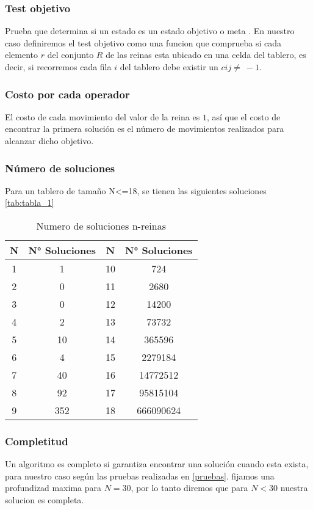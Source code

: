 \documentclass[conference]{IEEEtran}
\begin{document}
\subsubsection{Test objetivo}\label{AA_6}
Prueba que determina si un estado es un estado objetivo o meta \cite{r2}. En nuestro caso definiremos el test objetivo como una funcion que comprueba si cada elemento $r$ del conjunto $R$ de las reinas esta ubicado  en una celda del tablero, es decir, si recorremos cada fila $i$ del tablero debe existir un $c{ij} \neq\ -1$.

\subsubsection{Costo por cada operador}\label{AA_7}
El costo de cada movimiento del valor de la reina es $1$, así que el costo de encontrar la primera solución es el número de movimientos realizados para alcanzar dicho objetivo.

\subsubsection{Número de soluciones}\label{AA_8}
Para un tablero de tamaño N<=18, se tienen las siguientes soluciones \autoref{tab:tabla_1}
\begin{table}[htbp]
\caption{Numero de soluciones n-reinas \cite{r6_erbas}}
\centering
\begin{center}
\begin{tabularx}{\columnwidth}{|C|C|C|C|}
\hline
N & N° Soluciones & N & N° Soluciones \\
 & 1 & 10 & 724 \\
2 & 0 & 11 &  2680 \\
3 & 0 & 12 &  14200 \\
4 & 2 & 13 &  73732 \\
5 & 10 & 14 &  365596 \\
6 & 4 & 15 &  2279184 \\
7 & 40 & 16 & 14772512 \\
8 & 92 & 17 & 95815104 \\
9 & 352 & 18 & 666090624 \\
\hline
\end{tabularx}
\label{tab:tabla_1}
\end{center}
\end{table}

\subsubsection{Completitud}\label{AA_9}
Un algoritmo es completo si garantiza encontrar una solución cuando esta exista, para nuestro caso según las pruebas realizadas en \autoref{pruebas}. fijamos una profundizad maxima para $N=30$, por lo tanto diremos que para $N<30$ nuestra solucion es completa.
\end{document}
